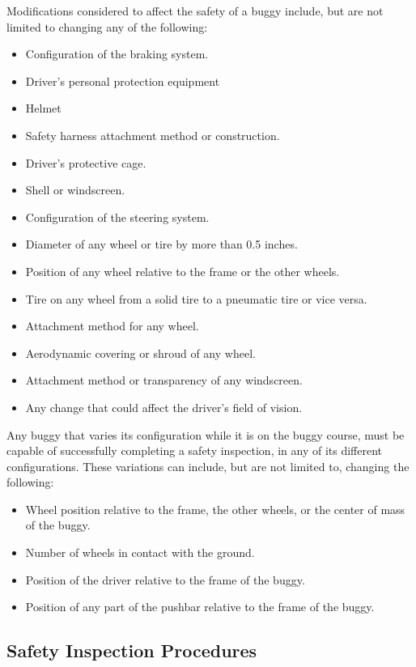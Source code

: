 	Modifications considered to affect the safety of a buggy include, but are not limited to changing any of the following:

	\begin{itemize}
		\item Configuration of the braking system.
		\item Driver's personal protection equipment
		\item Helmet
		\item Safety harness attachment method or construction.
		\item Driver's protective cage.
		\item Shell or windscreen.
		\item Configuration of the steering system.
		\item Diameter of any wheel or tire by more than 0.5 inches.
		\item Position of any wheel relative to the frame or the other wheels.
		\item Tire on any wheel from a solid tire to a pneumatic tire or vice versa.
		\item Attachment method for any wheel.
		\item Aerodynamic covering or shroud of any wheel.
		\item Attachment method or transparency of any windscreen.
		\item Any change that could affect the driver's field of vision.
	\end{itemize}

	Any buggy that varies its configuration while it is on the buggy course, must be capable of successfully completing a safety inspection, in any of its different configurations. These variations can include, but are not limited to, changing the following:

	\begin{itemize}
		\item Wheel position relative to the frame, the other wheels, or the center of mass of the buggy.
		\item Number of wheels in contact with the ground.
		\item Position of the driver relative to the frame of the buggy.
		\item Position of any part of the pushbar relative to the frame of the buggy.
	\end{itemize}

\subsection{Safety Inspection Procedures}

